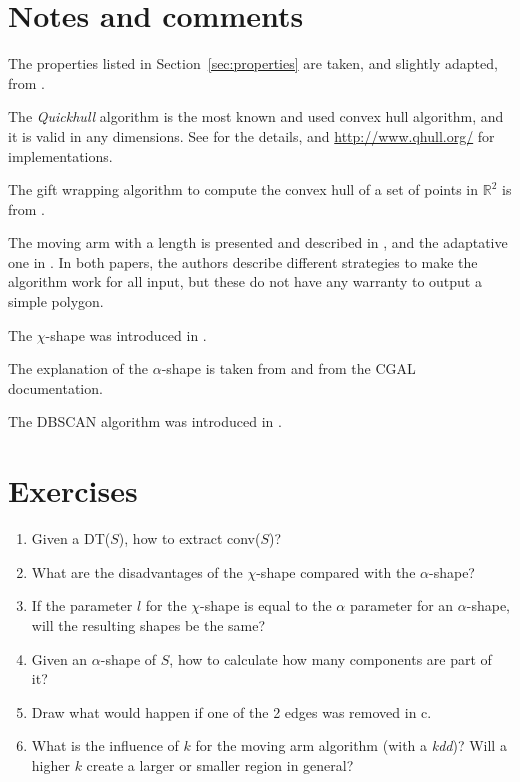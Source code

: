 %





%
\section{Notes and comments}

The properties listed in Section~\ref{sec:properties} are taken, and slightly adapted, from \citet{Galton06}. 

The \emph{Quickhull} algorithm is the most known and used convex hull algorithm, and it is valid in any dimensions. See \citet{Barber96} for the details, and \url{http://www.qhull.org/} for implementations.

The gift wrapping algorithm to compute the convex hull of a set of points in $\mathbb{R}^2$ is from \citet{Jarvis73}.

The moving arm with a length is presented and described in \citet{Galton06}, and the adaptative one in \citet{Moreira07}.
In both papers, the authors describe different strategies to make the algorithm work for all input, but these do not have any warranty to output a simple polygon.

The $\chi$-shape was introduced in \citet{Duckham08}.

The explanation of the $\alpha$-shape is taken from \citet{Edelsbrunner94} and from the CGAL documentation.

The DBSCAN algorithm was introduced in \citet{Ester96}.


%
\section{Exercises}

\begin{enumerate}
  \item Given a DT($S$), how to extract conv($S$)?
  \item What are the disadvantages of the $\chi$-shape compared with the $\alpha$-shape?
  \item If the parameter $l$ for the $\chi$-shape is equal to the $\alpha$ parameter for an $\alpha$-shape, will the resulting shapes be the same?
  \item Given an $\alpha$-shape of $S$, how to calculate how many components are part of it? 
  \item Draw what would happen if one of the 2 edges was removed in c.
  \item What is the influence of $k$ for the moving arm algorithm (with a \emph{kdd})? Will a higher $k$ create a larger or smaller region in general?
\end{enumerate}
